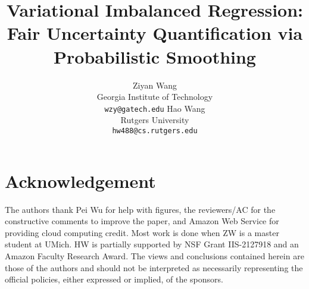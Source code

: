 \documentclass{article}
\title{Variational Imbalanced Regression: Fair Uncertainty Quantification via Probabilistic Smoothing}
\author{%
  Ziyan Wang \\
  Georgia Institute of Technology \\
  \texttt{wzy@gatech.edu}
  \And
  Hao Wang \\
  Rutgers University \\
  \texttt{hw488@cs.rutgers.edu}\\
}
\begin{document}
\maketitle



\section*{Acknowledgement}
The authors thank Pei Wu for help with figures, the reviewers/AC for the constructive comments to improve the paper, and Amazon Web Service for providing cloud computing credit. Most work is done when ZW is a master student at UMich. HW is partially supported by NSF Grant IIS-2127918 and an Amazon Faculty Research Award. The views and conclusions contained herein
are those of the authors and should not be interpreted as necessarily representing the official policies,
either expressed or implied, of the sponsors.



\newpage
\appendix

\end{document}

